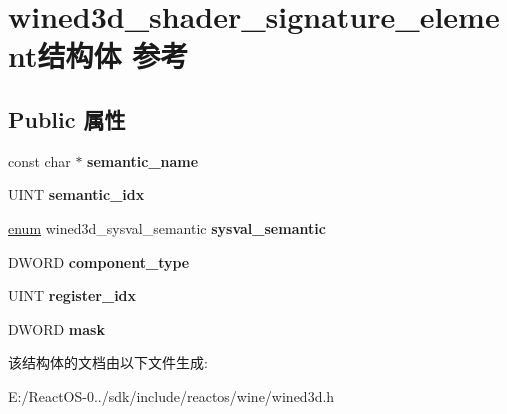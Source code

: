 \hypertarget{structwined3d__shader__signature__element}{}\section{wined3d\+\_\+shader\+\_\+signature\+\_\+element结构体 参考}
\label{structwined3d__shader__signature__element}
\subsection*{Public 属性}
\begin{DoxyCompactItemize}
\item 
\mbox{\label{structwined3d__shader__signature__element_a1348f4c7dcd6859dfd91c34c79fe1ef7}} 
const char $\ast$ {\bfseries semantic\+\_\+name}
\item 
\mbox{\label{structwined3d__shader__signature__element_a6deca5d64621d2b18a4ddfedebd3710f}} 
U\+I\+NT {\bfseries semantic\+\_\+idx}
\item 
\mbox{\label{structwined3d__shader__signature__element_a957b635adde7d073b360d1555d78fd9c}} 
\hyperlink{interfaceenum}{enum} wined3d\+\_\+sysval\+\_\+semantic {\bfseries sysval\+\_\+semantic}
\item 
\mbox{\label{structwined3d__shader__signature__element_a981373757a8f9d14ee166318d320f7bb}} 
D\+W\+O\+RD {\bfseries component\+\_\+type}
\item 
\mbox{\label{structwined3d__shader__signature__element_a911d833bc9d2d0da70df18763711129d}} 
U\+I\+NT {\bfseries register\+\_\+idx}
\item 
\mbox{\label{structwined3d__shader__signature__element_a53182c0108286f9441b68a0e2ae67b72}} 
D\+W\+O\+RD {\bfseries mask}
\end{DoxyCompactItemize}


该结构体的文档由以下文件生成\+:\begin{DoxyCompactItemize}
\item 
E\+:/\+React\+O\+S-\/0../sdk/include/reactos/wine/wined3d.\+h\end{DoxyCompactItemize}
